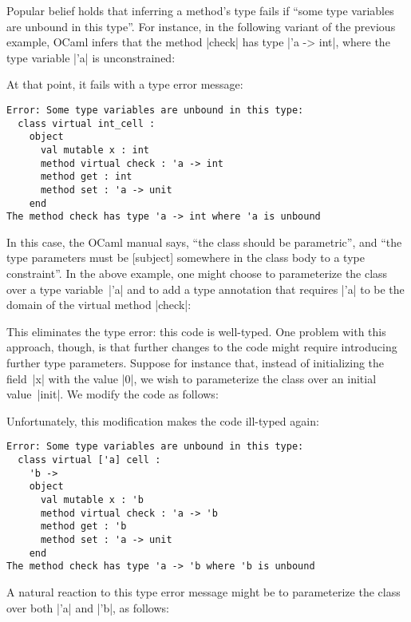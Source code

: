\documentclass[11pt,a4paper,twoside]{article}
\begin{document}
Popular belief holds that inferring a method's type fails if ``some type
variables are unbound in this type''. For instance, in the following variant
of the previous example, OCaml infers that the method \oc|check| has type
\oc|'a -> int|, where the type variable \oc|'a| is unconstrained:
%

At that point, it fails with a type error message:
%
\begin{mdframed}[backgroundcolor=red!10]
\begin{lstlisting}[keywords={}]
Error: Some type variables are unbound in this type:
  class virtual int_cell :
    object
      val mutable x : int
      method virtual check : 'a -> int
      method get : int
      method set : 'a -> unit
    end
The method check has type 'a -> int where 'a is unbound
\end{lstlisting}
\end{mdframed}

In this case, the OCaml manual says, ``the class should be parametric'', and
``the type parameters must be [subject] somewhere in the class body to a type
constraint''. In the above example, one might choose to parameterize the class
over a type variable~\oc|'a| and to add a type annotation that requires
\oc|'a| to be the domain of the virtual method \oc|check|:
%

This eliminates the type error: this code is well-typed. One problem with this
approach, though, is that further changes to the code might require
introducing further type parameters. Suppose for instance that, instead of
initializing the field~\oc|x| with the value \oc|0|, we wish to parameterize
the class over an initial value~\oc|init|. We modify the code as follows:
%

Unfortunately, this modification makes the code ill-typed again:
%
\begin{mdframed}[backgroundcolor=red!10]
\begin{lstlisting}[keywords={}]
Error: Some type variables are unbound in this type:
  class virtual ['a] cell :
    'b ->
    object
      val mutable x : 'b
      method virtual check : 'a -> 'b
      method get : 'b
      method set : 'a -> unit
    end
The method check has type 'a -> 'b where 'b is unbound
\end{lstlisting}
\end{mdframed}

A natural reaction to this type error message might be to parameterize the
class over both \oc|'a| and \oc|'b|, as follows:
%
\end{document}
